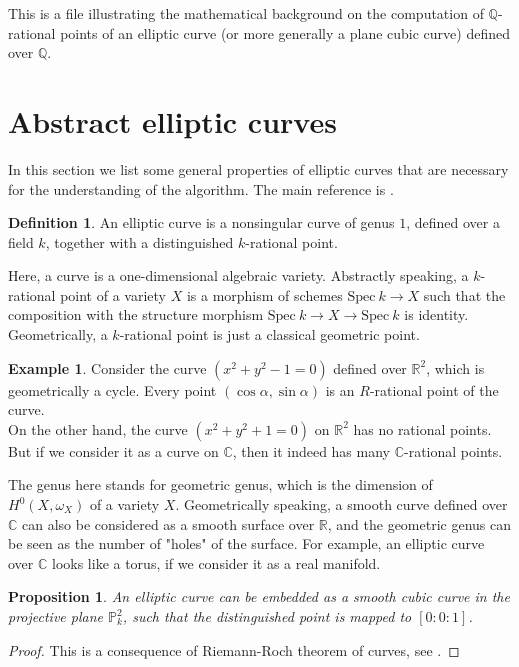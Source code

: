 \documentclass[a4paper,oneside,11pt]{article}
\newcommand{\bC}{\mathbb{C}}
\newcommand{\bP}{\mathbb{P}}
\newcommand{\bQ}{\mathbb{Q}}
\newcommand{\bR}{\mathbb{R}}
\newcommand{\Spec}{\mathrm{Spec}\ }
\newtheorem{prop}[thm]{Proposition}
\theoremstyle{definition}
\newtheorem{defn}[thm]{Definition}
\newtheorem{eg}[thm]{Example}
\begin{document}
This is a file illustrating the mathematical background on the computation of $\bQ$-rational points of an elliptic curve (or more generally a plane cubic curve) defined over $\bQ$.
\section{Abstract elliptic curves}
In this section we list some general properties of elliptic curves that are necessary for the understanding of the algorithm. The main reference is \cite[Chapter IV]{Har}.

\begin{defn}
	An elliptic curve is a nonsingular curve of genus $1$, defined over a field $k$, together with a distinguished $k$-rational point.
\end{defn}

Here, a curve is a one-dimensional algebraic variety. Abstractly speaking, a $k$-rational point of a variety $X$ is a morphism of schemes $\Spec k \rightarrow X$ such that the composition with the structure morphism $\Spec k \rightarrow X \rightarrow \Spec k$ is identity. Geometrically, a $k$-rational point is just a classical geometric point.

\begin{eg}
	Consider the curve $(x^2+y^2-1=0)$ defined over $\bR^2$, which is geometrically a cycle. Every point $(\cos\alpha, \sin\alpha)$ is an $R$-rational point of the curve.\\
	On the other hand, the curve $(x^2+y^2+1=0)$ on $\bR^2$ has no rational points. But if we consider it as a curve on $\bC$, then it indeed has many $\bC$-rational points.
\end{eg}

The genus here stands for geometric genus, which is the dimension of $H^0(X,\omega_X)$ of a variety $X$. Geometrically speaking, a smooth curve defined over $\bC$ can also be considered as a smooth surface over $\bR$, and the geometric genus can be seen as the number of "holes" of the surface. For example, an elliptic curve over $\bC$ looks like a torus, if we consider it as a real manifold.

\begin{prop}
	An elliptic curve can be embedded as a smooth cubic curve in the projective plane $\bP^2_k$, such that the distinguished point is mapped to $[0:0:1]$.
\end{prop}
\begin{proof}
	This is a consequence of Riemann-Roch theorem of curves, see \cite[Theorem IV.1.3]{Har}.
\end{proof}
\end{document}
